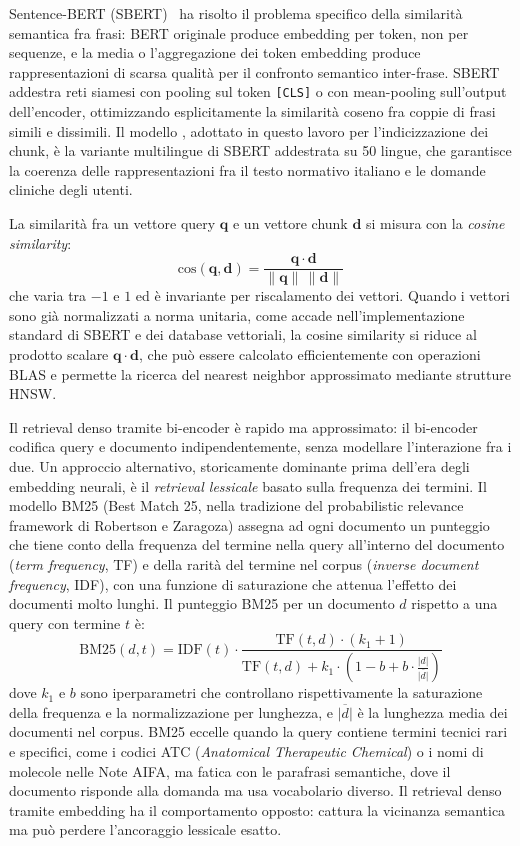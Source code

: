 Sentence-BERT (SBERT)~\cite{reimers2019sbert} ha risolto il problema
specifico della similarità semantica fra frasi: BERT originale produce
embedding per token, non per sequenze, e la media o l'aggregazione dei token
embedding produce rappresentazioni di scarsa qualità per il confronto
semantico inter-frase. SBERT addestra reti siamesi con pooling sul token
\texttt{[CLS]} o con mean-pooling sull'output dell'encoder, ottimizzando
esplicitamente la similarità coseno fra coppie di frasi simili e dissimili.
Il modello \embedmodel{}, adottato in questo lavoro per l'indicizzazione
dei chunk, è la variante multilingue di SBERT addestrata su 50 lingue,
che garantisce la coerenza delle rappresentazioni fra il testo normativo
italiano e le domande cliniche degli utenti.

La similarità fra un vettore query $\mathbf{q}$ e un vettore chunk
$\mathbf{d}$ si misura con la \emph{cosine similarity}:
\[
  \text{cos}(\mathbf{q}, \mathbf{d}) = \frac{\mathbf{q} \cdot \mathbf{d}}{\|\mathbf{q}\|\,\|\mathbf{d}\|}
\]
che varia tra $-1$ e $1$ ed è invariante per riscalamento dei vettori. Quando
i vettori sono già normalizzati a norma unitaria, come accade nell'implementazione
standard di SBERT e dei database vettoriali, la cosine similarity si riduce
al prodotto scalare $\mathbf{q} \cdot \mathbf{d}$, che può essere calcolato
efficientemente con operazioni BLAS e permette la ricerca del nearest neighbor
approssimato mediante strutture HNSW.

Il retrieval denso tramite bi-encoder è rapido ma approssimato: il bi-encoder
codifica query e documento indipendentemente, senza modellare l'interazione
fra i due. Un approccio alternativo, storicamente dominante prima dell'era
degli embedding neurali, è il \emph{retrieval lessicale} basato sulla
frequenza dei termini. Il modello BM25 (Best Match 25, nella tradizione
del probabilistic relevance framework di Robertson e Zaragoza) assegna ad
ogni documento un punteggio che tiene conto della frequenza del termine nella
query all'interno del documento (\emph{term frequency}, TF) e della rarità
del termine nel corpus (\emph{inverse document frequency}, IDF), con una
funzione di saturazione che attenua l'effetto dei documenti molto lunghi.
Il punteggio BM25 per un documento $d$ rispetto a una query con termine $t$
è:
\[
  \text{BM25}(d,t) = \text{IDF}(t) \cdot
    \frac{\text{TF}(t,d) \cdot (k_1+1)}{\text{TF}(t,d) + k_1 \cdot \left(1 - b + b \cdot \frac{|d|}{\overline{|d|}}\right)}
\]
dove $k_1$ e $b$ sono iperparametri che controllano rispettivamente la
saturazione della frequenza e la normalizzazione per lunghezza, e
$\overline{|d|}$ è la lunghezza media dei documenti nel corpus. BM25 eccelle
quando la query contiene termini tecnici rari e specifici, come i codici
ATC (\emph{Anatomical Therapeutic Chemical}) o i nomi di molecole nelle Note AIFA, ma fatica con le parafrasi
semantiche, dove il documento risponde alla domanda ma usa vocabolario
diverso. Il retrieval denso tramite embedding ha il comportamento opposto:
cattura la vicinanza semantica ma può perdere l'ancoraggio lessicale esatto.

